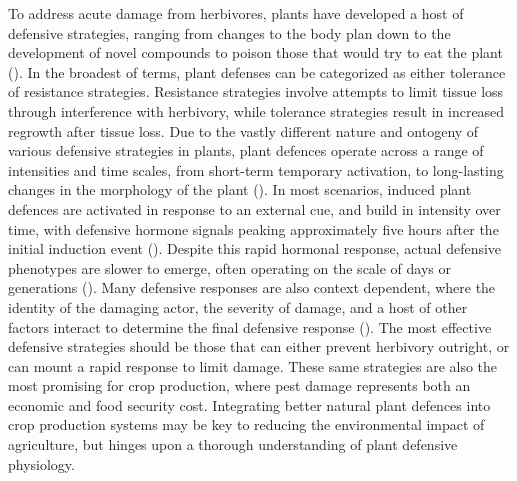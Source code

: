 \documentclass[12pt, letterpaper, ]{report}
\begin{document}
To address acute damage from herbivores, plants have developed a host of defensive strategies, ranging from changes to the body plan down to the development of novel compounds to poison those that would try to eat the plant (\cite{agrawal_plant_2006}). In the broadest of terms, plant defenses can be categorized as either tolerance of resistance strategies. Resistance strategies involve attempts to limit tissue loss through interference with herbivory, while tolerance strategies result in increased regrowth after tissue loss. Due to the vastly different nature and ontogeny of various defensive strategies in plants, plant defences operate across a range of intensities and time scales, from short-term temporary activation, to long-lasting changes in the morphology of the plant (\cite{agrawal_plant_2006, karban_induced_1989}). In most scenarios, induced plant defences are activated in response to an external cue, and build in intensity over time, with defensive hormone signals peaking approximately five hours after the initial induction event (\cite{schmelz_quantitative_2003}). Despite this rapid hormonal response, actual defensive phenotypes are slower to emerge, often operating on the scale of days or generations (\cite{karban_induced_1989}). Many defensive responses are also context dependent, where the identity of the damaging actor, the severity of damage, and a host of other factors interact to determine the final defensive response (\cite{waterman_simulated_2019}). The most effective defensive strategies should be those that can either prevent herbivory outright, or can mount a rapid response to limit damage. These same strategies are also the most promising for crop production, where pest damage represents both an economic and food security cost. Integrating better natural plant defences into crop production systems may be key to reducing the environmental impact of agriculture, but hinges upon a thorough understanding of plant defensive physiology.
\end{document}
